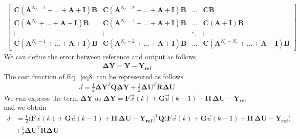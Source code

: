\documentclass[12pt,a4paper,oneside]{book}
\begin{document}
\begin{onehalfspace}
\begin{equation}
\begin{aligned}
\begin{bmatrix}
			\mathbf{C}\left(\mathbf{A}^{N_c-1}+...+\mathbf{A}+\mathbf{I}\right) 
			\mathbf{B} & 
			\mathbf{C}\left(\mathbf{A}^{N_c-2}+...+\mathbf{A}+\mathbf{I}\right) 
			\mathbf{B} & \dots & \mathbf{C}\mathbf{B} \\[6pt]
			\mathbf{C}\left(\mathbf{A}^{N_c}+...+\mathbf{A}+\mathbf{I}\right) 
			\mathbf{B} & 
			\mathbf{C}\left(\mathbf{A}^{N_c-1}+...+\mathbf{A}+\mathbf{I}\right) 
			\mathbf{B} & \dots & \mathbf{C}\left(\mathbf{A}+\mathbf{I}\right) 
			\mathbf{B} \\[6pt]
			\vdots & \vdots & \ddots  & \vdots \\[6pt]
			\mathbf{C}\left(\mathbf{A}^{N_p-1}+...+\mathbf{A}+\mathbf{I}\right) 
			\mathbf{B} & 
			\mathbf{C}\left(\mathbf{A}^{N_p-2}+...+\mathbf{A}+\mathbf{I}\right) 
			\mathbf{B} & \dots &
			\mathbf{C}\left(\mathbf{A}^{N_p-N_c}+...+\mathbf{A}+\mathbf{I}\right)
			 \mathbf{B}
		\end{bmatrix}
	\end{aligned}
\end{equation}
We can define the error between reference and output as follows 
\begin{equation}\label{eq18}
	\begin{aligned}
		\mathbf{\Delta Y} = \mathbf{Y}-\mathbf{Y_{ref}}
	\end{aligned}
\end{equation}
The cost function of Eq.~\eqref{eq8} can be represented as follows
\begin{equation}\label{eq19}
	\begin{aligned}
		J = \frac{1}{2}\mathbf{\Delta Y}^T\mathbf{Q}\mathbf{\Delta Y} + 
		\frac{1}{2} \mathbf{\Delta U}^T\mathbf{R}\mathbf{\Delta U}
	\end{aligned}
\end{equation}
We can express the term $\mathbf{\Delta Y}$ as $\mathbf{\Delta Y} = 
\mathbf{F}\vec{x}(k)+\mathbf{G}\vec{u}(k-1)+\mathbf{H}\,\mathbf{\Delta U} - 
\mathbf{Y_{ref}}$ and we obtain
\begin{equation}\label{eq20}
	\begin{aligned}
		J &= \frac{1}{2}\Big( 
		\mathbf{F}\vec{x}(k)+\mathbf{G}\vec{u}(k-1)+\mathbf{H}\,\mathbf{\Delta 
		U} - \mathbf{Y_{ref}}\Big) ^T\mathbf{Q}\Big( 
		\mathbf{F}\vec{x}(k)+\mathbf{G}\vec{u}(k-1)+\mathbf{H}\,\mathbf{\Delta 
		U} - \mathbf{Y_{ref}}\Big) \\[6pt]
		&+ \frac{1}{2} \mathbf{\Delta U}^T\mathbf{R}\mathbf{\Delta U}
	\end{aligned}
\end{equation}

\end{onehalfspace}
\end{document}
